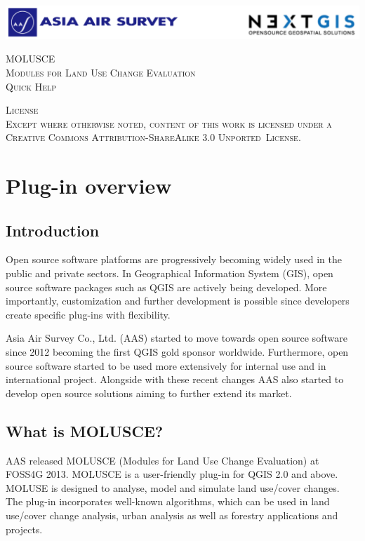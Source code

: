 \documentclass{report}
\begin{document}
\begin{titlepage}


\center %
 
\includegraphics[width=1.0\textwidth]{img/logos.png}

\vfill %

\textsc{\LARGE MOLUSCE}\\[1.5cm] 
\textsc{\Large Modules for Land Use Change Evaluation}\\[0.5cm] 
\textsc{\large Quick Help}\\[0.5cm]

\vfill %

 
\textsc{
License\\
Except where otherwise noted, content of this work is licensed under a Creative
Commons Attribution-ShareAlike 3.0 Unported~License.
}

\end{titlepage}


\tableofcontents


\chapter{Plug-in overview}
\section{Introduction}

Open source software platforms are progressively becoming widely used in the public and private
sectors. In Geographical Information System (GIS), open source software packages such as QGIS
are actively being developed. More importantly, customization and further development is possible
since developers create specific plug-ins with flexibility.

Asia Air Survey Co., Ltd. (AAS) started to move towards open source software since 2012
becoming the first QGIS gold sponsor worldwide. Furthermore, open source software started to be
used more extensively for internal use and in international project. Alongside with these recent
changes AAS also started to develop open source solutions aiming to further extend its market.


\section{What is MOLUSCE?}
AAS released MOLUSCE (Modules for Land Use Change Evaluation) at FOSS4G 2013.
MOLUSCE is a user-friendly plug-in for QGIS 2.0 and above. MOLUSE is designed to analyse,
model and simulate land use/cover changes. The plug-in incorporates well-known algorithms,
which can be used in land use/cover change analysis, urban analysis as well as forestry applications
and projects.
\end{document}

